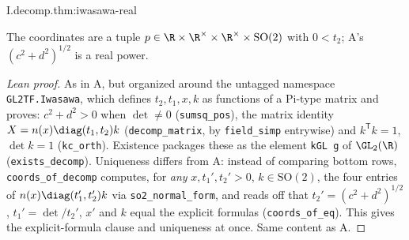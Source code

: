 \begin{theorem}
\end{theorem}
\begin{tfformal}{I.decomp.thm:iwasawa-real}
\begin{tffidelity}
The coordinates are a tuple $p\in\R\times\R^\times\times\R^\times\times\mathrm{SO}(2)$ with $0<t_2$; A's $(c^2+d^2)^{1/2}$ is a real power.
\end{tffidelity}
\end{tfformal}
\begin{proof}[Lean proof]
As in A, but organized around the untagged namespace \texttt{GL2TF.Iwasawa}, which defines $t_2,t_1,x,k$ as functions of a Pi-type matrix and proves: $c^2+d^2>0$ when $\det\neq0$ (\texttt{sumsq\_pos}), the matrix identity $X=n(x)\diag(t_1,t_2)k$ (\texttt{decomp\_matrix}, by \texttt{field\_simp} entrywise) and $k^{\mathsf T}k=1$, $\det k=1$ (\texttt{kc\_orth}). Existence packages these as the element \texttt{kGL g} of $\GL_2(\R)$ (\texttt{exists\_decomp}). Uniqueness differs from A: instead of comparing bottom rows, \texttt{coords\_of\_decomp} computes, for \emph{any} $x,t_1',t_2'>0$, $k\in\mathrm{SO}(2)$, the four entries of $n(x)\diag(t_1',t_2')k$ via \texttt{so2\_normal\_form}, and reads off that $t_2'=(c^2+d^2)^{1/2}$, $t_1'=\det/t_2'$, $x'$ and $k$ equal the explicit formulas (\texttt{coords\_of\_eq}). This gives the explicit-formula clause and uniqueness at once. Same content as A.
\end{proof}


